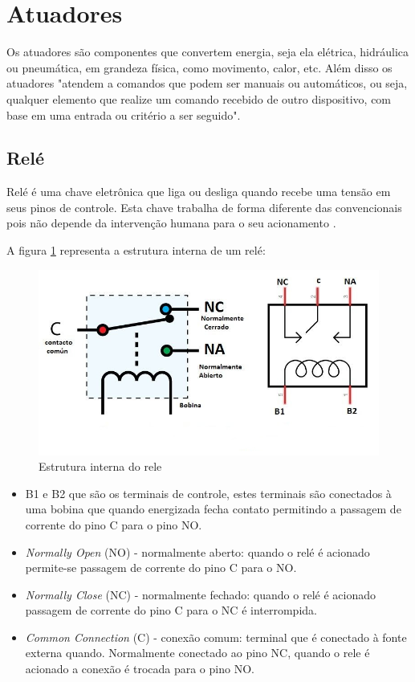 \section{Atuadores}

Os atuadores são componentes que convertem energia, seja ela elétrica, hidráulica ou pneumática, em grandeza física, como movimento, calor, etc. Além disso os atuadores "atendem a comandos que podem ser manuais ou automáticos, ou seja, qualquer elemento que realize um comando recebido de outro dispositivo, com base em uma entrada ou critério a ser seguido". \cite{brugnari2010automaccao}

\subsection{Relé}

Relé é uma chave eletrônica que liga ou desliga quando recebe uma tensão em seus pinos de controle. Esta chave trabalha de forma diferente das convencionais pois não depende da intervenção humana para o seu acionamento \cite[p.28]{ribeiro1999automaccao}.

A figura \ref{fig:rele} representa a estrutura interna de um relé:

\begin{figure}[H]
\centering
\includegraphics[scale=0.3]{./04-figuras/reles.jpg}
\caption{Estrutura interna do rele}
\vspace{-\baselineskip}
\label{fig:rele}
\end{figure}

\begin{itemize}[itemsep=0em]
\item B1 e B2 que são os terminais de controle, estes terminais são conectados à uma bobina que quando energizada fecha contato permitindo a passagem de corrente do pino C para o pino NO.
\item \textit{Normally Open} (NO) - normalmente aberto: quando o relé é acionado permite-se passagem de corrente do pino C para o NO.
\item \textit{Normally Close} (NC) - normalmente fechado: quando o relé é acionado passagem de corrente do pino C para o NC é interrompida.
\item \textit{Common Connection} (C) - conexão comum: terminal que é  conectado à fonte externa quando. Normalmente conectado ao pino NC, quando o rele é acionado a conexão é trocada para o pino NO.
\end{itemize}


